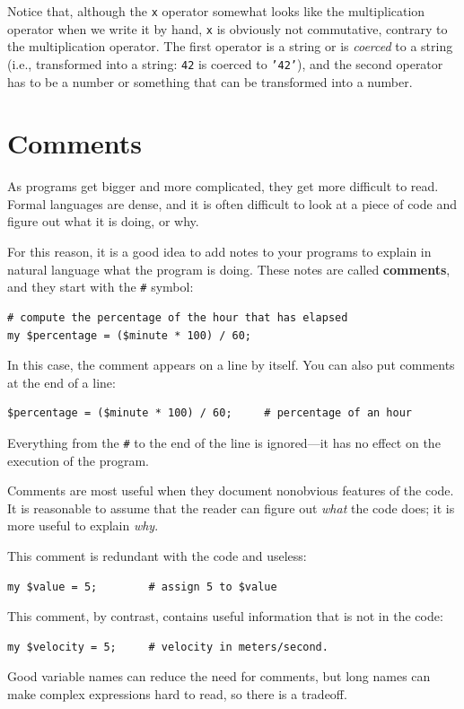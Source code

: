 Notice that, although the {\tt x} operator somewhat looks like 
the multiplication operator when we write it by hand, {\tt x} 
is obviously not commutative, contrary to the {\tt *} 
multiplication operator. The first operator is a string or is 
\emph{coerced} to a string (i.e., transformed into a string: 
{\tt 42} is coerced to {\tt '42'}), and the second operator 
has to be a number or something that can be transformed 
into a number.


\section{Comments}

As programs get bigger and more complicated, they get more difficult
to read.  Formal languages are dense, and it is often difficult to
look at a piece of code and figure out what it is doing, or why.

For this reason, it is a good idea to add notes to your programs to explain
in natural language what the program is doing.  These notes are called
{\bf comments}, and they start with the \verb"#" symbol:

\begin{verbatim}
# compute the percentage of the hour that has elapsed
my $percentage = ($minute * 100) / 60;
\end{verbatim}
%
In this case, the comment appears on a line by itself.  You can also put
comments at the end of a line:

\begin{verbatim}
$percentage = ($minute * 100) / 60;     # percentage of an hour
\end{verbatim}
%
Everything from the {\tt \#} to the end of the line is ignored---it
has no effect on the execution of the program.

Comments are most useful when they document nonobvious features of
the code.  It is reasonable to assume that the reader can figure out
{\em what} the code does; it is more useful to explain {\em why}.

This comment is redundant with the code and useless:

\begin{verbatim}
my $value = 5;        # assign 5 to $value
\end{verbatim}
%
This comment, by contrast, contains useful information that 
is not in the code:

\begin{verbatim}
my $velocity = 5;     # velocity in meters/second. 
\end{verbatim}
%
Good variable names can reduce the need for comments, but
long names can make complex expressions hard to read, so there is
a tradeoff.


